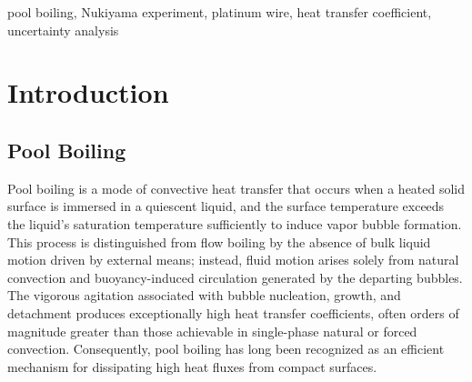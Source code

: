 \documentclass[conference]{IEEEtran}
\begin{document}
\begin{abstract}
This study investigates pool boiling heat transfer from a thin platinum wire to demineralized water at atmospheric pressure, motivated by the relevance of direct immersion cooling for thermal management of microelectronics components. We replicated the seminal experiment originally conducted by Nukiyama in 1934, assembling a test piece comprising a platinum wire (nominal diameter $100~\mathrm{\mu m}$, length $60~\mathrm{mm}$) mounted on chopsticks and immersed in a water tank, and supplied Joule heating power via a DC power supply while recording voltage, current, and water temperature. The raw measurements were post-processed to estimate the wire average temperature from its electrical resistivity, and to compute the heating power, heat flux, and convective heat transfer coefficient (HTC) together with their uncertainties propagated through the Root Sum of Square (RSS) method. The resulting boiling curve exhibits the characteristic transition from single-phase natural convection to nucleate boiling, with the HTC jumping from approximately $1$--$5~\mathrm{kW/(m^2\,K)}$ in the natural-convection branch to $8$--$14~\mathrm{kW/(m^2\,K)}$ once nucleate boiling is established. The relative uncertainties of the derived quantities were found to be dominated by the wire temperature estimate due to the shallow slope of the platinum resistivity--temperature relationship. These results confirm the fundamental features of Nukiyama's original findings and demonstrate the feasibility of a low-cost educational setup for studying pool boiling phenomena, while highlighting the critical role of measurement accuracy in determining the wire temperature.
\end{abstract}

\begin{IEEEkeywords}
pool boiling, Nukiyama experiment, platinum wire, heat transfer coefficient, uncertainty analysis
\end{IEEEkeywords}

\section{Introduction}

\subsection{Pool Boiling}
Pool boiling is a mode of convective heat transfer that occurs when a heated solid surface is immersed in a quiescent liquid, and the surface temperature exceeds the liquid's saturation temperature sufficiently to induce vapor bubble formation. This process is distinguished from flow boiling by the absence of bulk liquid motion driven by external means; instead, fluid motion arises solely from natural convection and buoyancy-induced circulation generated by the departing bubbles. The vigorous agitation associated with bubble nucleation, growth, and detachment produces exceptionally high heat transfer coefficients, often orders of magnitude greater than those achievable in single-phase natural or forced convection. Consequently, pool boiling has long been recognized as an efficient mechanism for dissipating high heat fluxes from compact surfaces.
\end{document}
